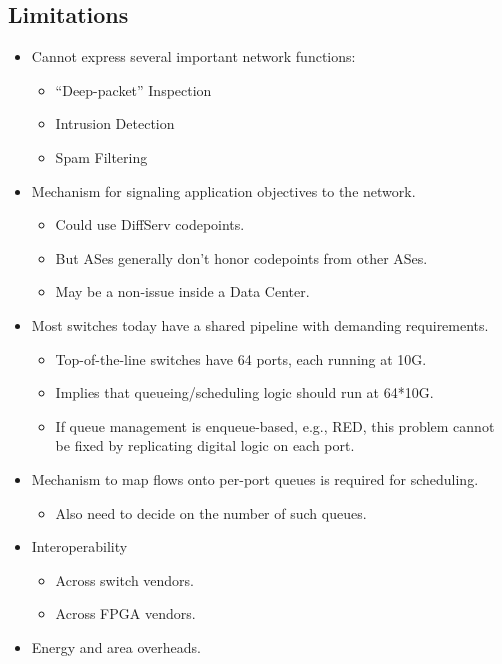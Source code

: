{\begin{multicols}{2}
\section*{Limitations}
\begin{itemize}
\item Cannot express several important network functions:
      \begin{itemize}
      \item ``Deep-packet'' Inspection
      \item Intrusion Detection
      \item Spam Filtering
      \end{itemize}
\item Mechanism for signaling application objectives to the network.
      \begin{itemize}
      \item Could use DiffServ codepoints.
      \item But ASes generally don't honor codepoints from other ASes.
      \item May be a non-issue inside a Data Center.
      \end{itemize}
\item Most switches today have a shared pipeline with demanding requirements.
      \begin{itemize}
      \item Top-of-the-line switches have 64 ports, each running at 10G.
      \item Implies that queueing/scheduling logic should run at 64*10G.
      \item If queue management is enqueue-based, e.g., RED, this problem cannot be fixed by replicating digital logic on each port.
      \end{itemize}
\item Mechanism to map flows onto per-port queues is required for scheduling.
      \begin{itemize}
      \item Also need to decide on the number of such queues.
      \end{itemize}
\item Interoperability
      \begin{itemize}
      \item Across switch vendors.
      \item Across FPGA vendors.
      \end{itemize}
\item Energy and area overheads.
\end{itemize}

\end{multicols}
}
